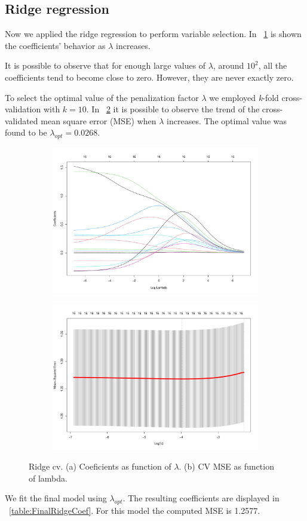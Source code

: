 \subsection{Ridge regression}

Now we applied the ridge regression to perform variable selection. In \Fig~\ref{fig:RidgeCoefVsLambda} is shown the coefficients' behavior as $\lambda$ increases. 

It is possible to observe that for enough large values of $\lambda$, around $10^2$, all the coefficients tend to become close to zero. However, they are never exactly zero.

To select the optimal value of the penalization factor $\lambda$ we employed \textit{k}-fold cross-validation with $\textit{k}=10$. In \Fig~\ref{fig:RidgeCvPlot} it is possible to observe the trend of the cross-validated mean square error (MSE) when $\lambda$ increases. The optimal value was found to be $\lambda_{opt} = 0.0268$.

\begin{figure}[H]
	\centering
	\begin{subfigure}{.5\textwidth}
		\centering
		\includegraphics[width=0.7\linewidth]{ImageFiles/Regression/Ridge/RidgeCoefVsLambda.pdf}
		\caption{}
		\label{fig:RidgeCoefVsLambda}
	\end{subfigure}%
	\begin{subfigure}{.5\textwidth}
		\centering
		\includegraphics[width=0.7\linewidth]{ImageFiles/Regression/Ridge/RidgeCvPlot.pdf}
		\caption{}
		\label{fig:RidgeCvPlot}
	\end{subfigure}
	\caption{Ridge cv. (a) Coeficients as function of $\lambda$. (b) CV MSE as function of lambda.}
	\label{fig:FinalFSSM}
\end{figure}

We fit the final model using $\lambda_{opt}$. The resulting coefficients are displayed in \Tab~\ref{table:FinalRidgeCoef}. For this model the computed MSE is 1.2577.

